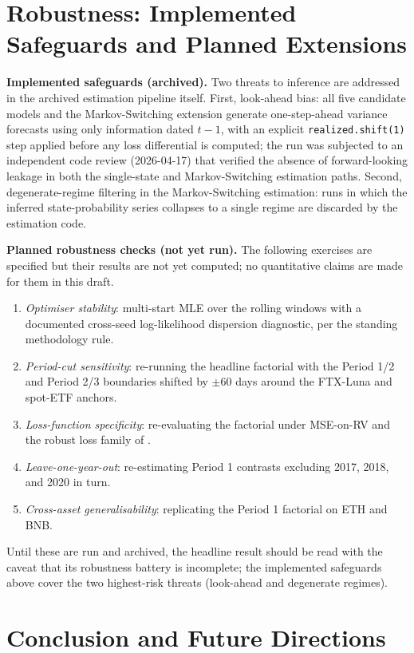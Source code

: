 \section{Robustness: Implemented Safeguards and Planned Extensions}
\label{sec:robustness}

\textbf{Implemented safeguards (archived).} Two threats to inference are addressed in the archived estimation pipeline itself. First, look-ahead bias: all five candidate models and the Markov-Switching extension generate one-step-ahead variance forecasts using only information dated $t-1$, with an explicit \texttt{realized.shift(1)} step applied before any loss differential is computed; the run was subjected to an independent code review (2026-04-17) that verified the absence of forward-looking leakage in both the single-state and Markov-Switching estimation paths. Second, degenerate-regime filtering in the Markov-Switching estimation: runs in which the inferred state-probability series collapses to a single regime are discarded by the estimation code.

\textbf{Planned robustness checks (not yet run).} The following exercises are specified but their results are not yet computed; no quantitative claims are made for them in this draft.
\begin{enumerate}
\item \emph{Optimiser stability}: multi-start MLE over the rolling windows with a documented cross-seed log-likelihood dispersion diagnostic, per the standing methodology rule.
\item \emph{Period-cut sensitivity}: re-running the headline factorial with the Period 1/2 and Period 2/3 boundaries shifted by $\pm 60$ days around the FTX-Luna and spot-ETF anchors.
\item \emph{Loss-function specificity}: re-evaluating the factorial under MSE-on-RV and the robust loss family of \citet{patton2011}.
\item \emph{Leave-one-year-out}: re-estimating Period 1 contrasts excluding 2017, 2018, and 2020 in turn.
\item \emph{Cross-asset generalisability}: replicating the Period 1 factorial on ETH and BNB.
\end{enumerate}
Until these are run and archived, the headline result should be read with the caveat that its robustness battery is incomplete; the implemented safeguards above cover the two highest-risk threats (look-ahead and degenerate regimes).

\section{Conclusion and Future Directions}
\label{sec:conclusion}

